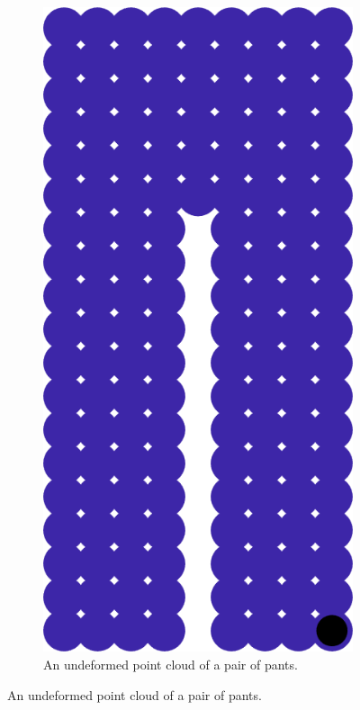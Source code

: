 \documentclass[11pt,a4paper, final, twoside]{article}
\theoremstyle{proposition}
\theoremstyle{definition}
\theoremstyle{remark}
\numberwithin{equation}{section}
\begin{document}
\begin{figure}[h]
\centering
\begin{subfigure}[t]{.5\textwidth}
  \centering
  \includegraphics{pantsUndefColor.png}
  \caption{An undeformed point cloud of a pair of pants.}
\end{subfigure}%

\end{figure}
\end{document}
